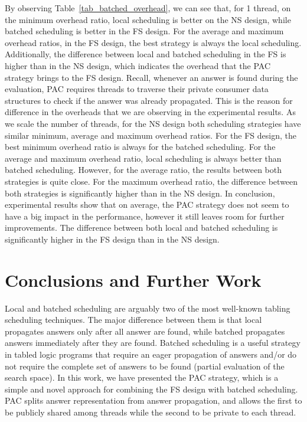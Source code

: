 \documentclass{llncs}
\begin{document}
By observing Table~\ref{tab_batched_overhead}, we can see that, for 1
thread, on the minimum overhead ratio, local scheduling is better on
the NS design, while batched scheduling is better in the FS
design. For the average and maximum overhead ratios, in the FS design,
the best strategy is always the local scheduling. Additionally, the
difference between local and batched scheduling in the FS is higher
than in the NS design, which indicates the overhead that the PAC
strategy brings to the FS design. Recall, whenever an answer is found
during the evaluation, PAC requires threads to traverse their private
consumer data structures to check if the answer was already
propagated. This is the reason for difference in the overheads that we
are observing in the experimental results. As we scale the number of
threads, for the NS design both scheduling strategies have similar
minimum, average and maximum overhead ratios. For the FS design, the
best minimum overhead ratio is always for the batched scheduling. For
the average and maximum overhead ratio, local scheduling is always
better than batched scheduling. However, for the average ratio, the
results between both strategies is quite close. For the maximum
overhead ratio, the difference between both strategies is
significantly higher than in the NS design. In conclusion,
experimental results show that on average, the PAC strategy does not
seem to have a big impact in the performance, however it still leaves
room for further improvements. The difference between both local and
batched scheduling is significantly higher in the FS design than in
the NS design.


\section{Conclusions and Further Work}

Local and batched scheduling are arguably two of the most well-known
tabling scheduling techniques. The major difference between them is
that local propagates answers only after all answer are found, while
batched propagates answers immediately after they are found. Batched
scheduling is a useful strategy in tabled logic programs that require
an eager propagation of answers and/or do not require the complete set
of answers to be found (partial evaluation of the search space). In
this work, we have presented the PAC strategy, which is a simple and
novel approach for combining the FS design with batched
scheduling. PAC splits answer representation from answer propagation,
and allows the first to be publicly shared among threads while the
second to be private to each thread.
\end{document}
